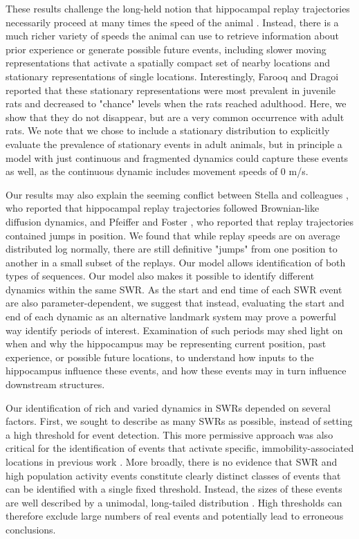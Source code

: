 \documentclass[times, twoside]{zHenriquesLab-StyleBioRxiv}
\begin{document}
These results challenge the long-held notion that hippocampal replay trajectories necessarily proceed at many times the speed of the animal \cite{NadasdyReplayTimeCompression1999, LeeMemorySequentialExperience2002, DavidsonHippocampalReplayExtended2009}. Instead, there is a much richer variety of speeds the animal can use to retrieve information about prior experience or generate possible future events, including slower moving representations that activate a spatially compact set of nearby locations and stationary representations of single locations. Interestingly, Farooq and Dragoi \cite{FarooqEmergencepreconfiguredplastic2019} reported that these stationary representations were most prevalent in juvenile rats and decreased to "chance" levels when the rats reached adulthood. Here, we show that they do not disappear, but are a very common occurrence with adult rats. We note that we chose to include a stationary distribution to explicitly evaluate the prevalence of stationary events in adult animals, but in principle a model with just continuous and fragmented dynamics could capture these events as well, as the continuous dynamic includes movement speeds of 0 m/s.

Our results may also explain the seeming conflict between Stella and colleagues \cite{StellaHippocampalReactivationRandom2019}, who reported that hippocampal replay trajectories followed Brownian-like diffusion dynamics, and Pfeiffer and Foster \cite{PfeifferAutoassociativedynamicsgeneration2015}, who reported that replay trajectories contained jumps in position. We found that while replay speeds are on average distributed log normally, there are still definitive "jumps" from one position to another in a small subset of the replays. Our model allows identification of both types of sequences. Our model also makes it possible to identify different dynamics within the same SWR. As the start and end time of each SWR event are also parameter-dependent, we suggest that instead, evaluating the start and end of each dynamic as an alternative landmark system may prove a powerful way identify periods of interest. Examination of such periods may shed light on when and why the hippocampus may be representing current position, past experience, or possible future locations, to understand how inputs to the hippocampus influence these events, and how these events may in turn influence downstream structures.

Our identification of rich and varied dynamics in SWRs depended on several factors. First, we sought to describe as many SWRs as possible, instead of setting a high threshold for event detection. This more permissive approach was also critical for the identification of events that activate specific, immobility-associated locations in previous work \cite{JaiDistincthippocampalcorticalmemory2017}. More broadly, there is no evidence that SWR and high population activity events constitute clearly distinct classes of events that can be identified with a single fixed threshold. Instead, the sizes of these events are well described by a unimodal, long-tailed distribution \cite{ChengNewExperiencesEnhance2008}. High thresholds can therefore exclude large numbers of real events and potentially lead to erroneous conclusions. 
\end{document}
